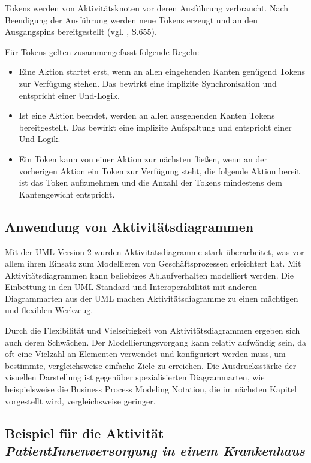 
Tokens werden von Aktivitätsknoten vor deren Ausführung verbraucht. Nach Beendigung der Ausführung werden neue Tokens erzeugt und an den Ausgangspins bereitgestellt (vgl. \citep{RumbaughJacobsonBooch2005}, S.655).

Für Tokens gelten zusammengefasst folgende Regeln:
\begin{itemize}
\item Eine Aktion startet erst, wenn an allen eingehenden Kanten genügend Tokens zur Verfügung stehen. Das bewirkt eine implizite Synchronisation und entspricht einer Und-Logik.
\item Ist eine Aktion beendet, werden an allen ausgehenden Kanten Tokens bereitgestellt. Das bewirkt eine implizite Aufspaltung und entspricht einer Und-Logik.
\item Ein Token kann von einer Aktion zur nächsten fließen, wenn an der vorherigen Aktion ein Token zur Verfügung steht, die folgende Aktion bereit ist das Token aufzunehmen und die Anzahl der Tokens mindestens dem Kantengewicht entspricht.
\end{itemize}


\subsection{Anwendung von Aktivitätsdiagrammen}
Mit der UML Version 2 wurden Aktivitätsdiagramme stark überarbeitet, was vor allem ihren Einsatz zum Modellieren von Geschäftsprozessen erleichtert hat. Mit Aktivitätsdiagrammen kann beliebiges Ablaufverhalten modelliert werden. Die Einbettung in den UML Standard und Interoperabilität mit anderen Diagrammarten aus der UML machen Aktivitätsdiagramme zu einen mächtigen und flexiblen Werkzeug.

Durch die Flexibilität und Vielseitigkeit von Aktivitätsdiagrammen ergeben sich auch deren Schwächen. Der Modellierungsvorgang kann relativ aufwändig sein, da oft eine Vielzahl an Elementen verwendet und konfiguriert werden muss, um bestimmte, vergleichsweise einfache Ziele zu erreichen. Die Ausdrucksstärke der visuellen Darstellung ist gegenüber spezialisierten Diagrammarten, wie beispielsweise die Business Process Modeling Notation, die im nächsten Kapitel vorgestellt wird, vergleichsweise geringer.


\subsection{Beispiel für die Aktivität \emph{PatientInnenversorgung in einem Krankenhaus}}

